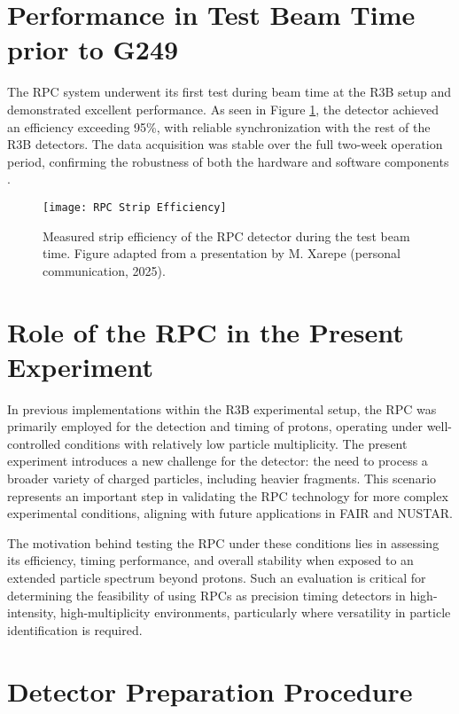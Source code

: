 {{{\section{Performance in Test Beam Time prior to G249}

The \gls{RPC} system underwent its first test during beam time at the \gls{R3B} setup and demonstrated excellent performance. As seen in Figure \ref{fig:RPCStripEff}, the detector achieved an efficiency exceeding 95\%, with reliable synchronization with the rest of the \gls{R3B} detectors. The data acquisition was stable over the full two-week operation period, confirming the robustness of both the hardware and software components \cite{xarepe_resistive_2023}.

\begin{figure}
	\centering
	\texttt{[image: RPC Strip Efficiency]}
	\caption[Measured strip efficiency of the RPC]{Measured strip efficiency of the \gls{RPC} detector during the test beam time. Figure adapted from a presentation by M. Xarepe (personal communication, 2025).}
	\label{fig:RPCStripEff}
\end{figure}

\section{Role of the RPC in the Present Experiment}

In previous implementations within the \gls{R3B} experimental setup, the \gls{RPC} was primarily employed for the detection and timing of protons, operating under well-controlled conditions with relatively low particle multiplicity. The present experiment introduces a new challenge for the detector: the need to process a broader variety of charged particles, including heavier fragments. This scenario represents an important step in validating the \gls{RPC} technology for more complex experimental conditions, aligning with future applications in \gls{FAIR} and NUSTAR.

The motivation behind testing the \gls{RPC} under these conditions lies in assessing its efficiency, timing performance, and overall stability when exposed to an extended particle spectrum beyond protons. Such an evaluation is critical for determining the feasibility of using \gls{RPC}s as precision timing detectors in high-intensity, high-multiplicity environments, particularly where versatility in particle identification is required.


\section{Detector Preparation Procedure}

}}}
